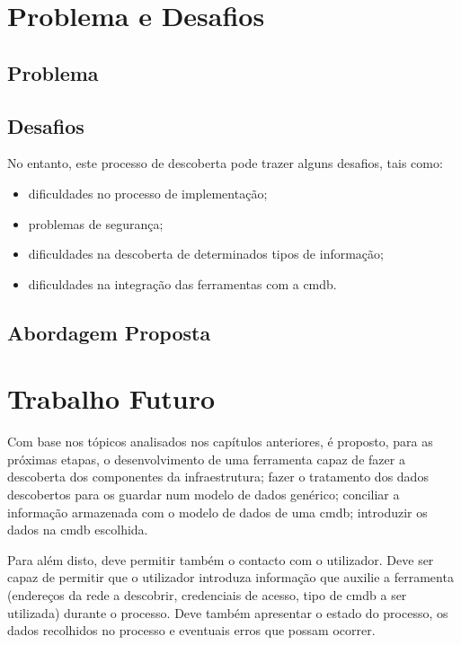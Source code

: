 \documentclass[
  oneside,
  11pt, a4paper,
  footinclude=true,
  headinclude=true,
  cleardoublepage=empty
]{scrbook}
\begin{document}
\chapter{Problema e Desafios}

\section{Problema}


\section{Desafios}

	No entanto, este processo de descoberta pode trazer alguns desafios, tais como:
\begin{itemize}
    \item dificuldades no processo de implementação;
    \item problemas de segurança;
    \item dificuldades na descoberta de determinados tipos de informação;
    \item dificuldades na integração das ferramentas com a \gls{cmdb}.
\end{itemize}


\section{Abordagem Proposta}
	         

\iffalse

\chapter{Trabalho Futuro}

Com base nos tópicos analisados nos capítulos anteriores, é proposto, para as próximas etapas, o desenvolvimento de uma ferramenta capaz de fazer a descoberta dos componentes da infraestrutura; fazer o tratamento dos dados descobertos para os guardar num modelo de dados genérico; conciliar a informação armazenada com o modelo de dados de uma \gls{cmdb}; introduzir os dados na \gls{cmdb} escolhida.

Para além disto, deve permitir também o contacto com o utilizador. Deve ser capaz de permitir que o utilizador introduza informação que auxilie a ferramenta (endereços da rede a descobrir, credenciais de acesso, tipo de \gls{cmdb} a ser utilizada) durante o processo. Deve também apresentar o estado do processo, os dados recolhidos no processo e eventuais erros que possam ocorrer.
\end{document}

